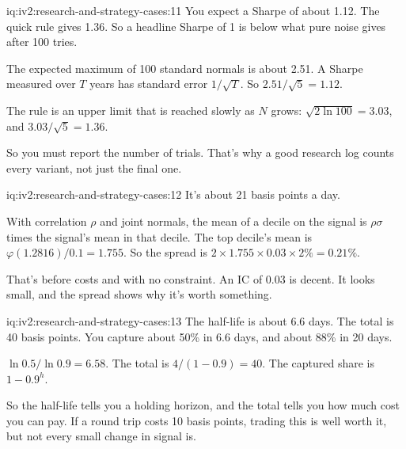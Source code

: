 \begin{solution}{iq:iv2:research-and-strategy-cases:11}
You expect a Sharpe of about 1.12. The quick rule gives 1.36. So a headline Sharpe of 1 is below what pure noise gives after 100 tries.

The expected maximum of 100 standard normals is about 2.51. A Sharpe measured over $T$ years has standard error $1/\sqrt{T}$. So $2.51/\sqrt{5} = 1.12$.

The rule is an upper limit that is reached slowly as $N$ grows: $\sqrt{2\ln 100} = 3.03$, and $3.03/\sqrt{5} = 1.36$.

So you must report the number of trials. That's why a good research log counts every variant, not just the final one.

\end{solution}

\begin{solution}{iq:iv2:research-and-strategy-cases:12}
It's about 21 basis points a day.

With correlation $\rho$ and joint normals, the mean of a decile on the signal is $\rho\sigma$ times the signal's mean in that decile. The top decile's mean is $\varphi(1.2816)/0.1 = 1.755$. So the spread is $2 \times 1.755 \times 0.03 \times 2\% = 0.21\%$.

That's before costs and with no constraint. An IC of 0.03 is decent. It looks small, and the spread shows why it's worth something.

\end{solution}

\begin{solution}{iq:iv2:research-and-strategy-cases:13}
The half-life is about 6.6 days. The total is 40 basis points. You capture about 50\% in 6.6 days, and about 88\% in 20 days.

$\ln 0.5/\ln 0.9 = 6.58$. The total is $4/(1 - 0.9) = 40$. The captured share is $1 - 0.9^h$.

So the half-life tells you a holding horizon, and the total tells you how much cost you can pay. If a round trip costs 10 basis points, trading this is well worth it, but not every small change in signal is.

\end{solution}

